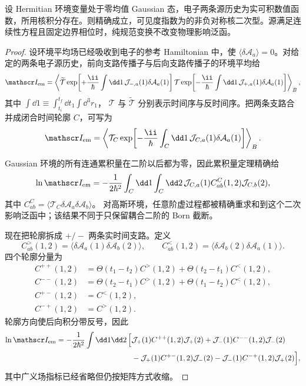 \begin{proposition}
设 Hermitian 环境变量处于零均值 Gaussian 态，电子两条源历史为实可积数值函数，所用核积分存在。则精确成立，可见度指数为的非负对称核二次型。源满足连续性方程且固定边界相位时，纯规范变换不改变物理影响泛函。
\end{proposition}
\begin{proof}
设环境平均场已经吸收到电子的参考 Hamiltonian 中，使
$\langle\delta\mathcal A_a\rangle=0$。对给定的两条电子源历史，前向支路传播子与后向支路传播子的环境平均给
\[
\mathscr I_{\rm em}
=\left\langle
\widetilde{\mathcal T}
\exp\!\left[
+\frac{\ii}{\hbar}\int\dd1\,
\mathcal J_{-,a}(1)\delta\mathcal A_a(1)
\right]
\mathcal T
\exp\!\left[
-\frac{\ii}{\hbar}\int\dd1\,
\mathcal J_{+,a}(1)\delta\mathcal A_a(1)
\right]
\right\rangle_B,
\]
其中
$\int\dd1\equiv\int_{t_i}^{t_f}\dd t_1\int\dd^3r_1$，
$\mathcal T$ 与 $\widetilde{\mathcal T}$ 分别表示时间序与反时间序。把两条支路合并成闭合时间轮廓 $C$，可写为
\[
\mathscr I_{\rm em}
=\left\langle
\mathcal T_C
\exp\!\left[
-\frac{\ii}{\hbar}
\int_C\dd1\,
\mathcal J_{C,a}(1)\delta\mathcal A_a(1)
\right]
\right\rangle_B.
\]

Gaussian 环境的所有连通累积量在二阶以后都为零，因此累积量定理精确给
\begin{equation*}
\ln\mathscr I_{\rm em}
=-\frac1{2\hbar^2}
\int_C\dd1\int_C\dd2\,
\mathcal J_{C,a}(1)
C^{C}_{ab}(1,2)
\mathcal J_{C,b}(2),
\end{equation*}
其中
$C^C_{ab}=\langle\mathcal T_C\delta\mathcal A_a\delta\mathcal A_b\rangle$。
对高斯环境，任意阶虚过程都被精确重求和到这个二次影响泛函中；该结果不同于只保留耦合二阶的 Born 截断。

现在把轮廓拆成 $+/-$ 两条实时间支路。定义
\[
C^>_{ab}(1,2)
=\langle\delta\mathcal A_a(1)\delta\mathcal A_b(2)\rangle,
\qquad
C^<_{ab}(1,2)
=\langle\delta\mathcal A_b(2)\delta\mathcal A_a(1)\rangle.
\]
四个轮廓分量为
\begin{align*}
C^{++}(1,2)
&=\Theta(t_1-t_2)C^>(1,2)
+\Theta(t_2-t_1)C^<(1,2),\\
C^{--}(1,2)
&=\Theta(t_2-t_1)C^>(1,2)
+\Theta(t_1-t_2)C^<(1,2),\\
C^{+-}(1,2)&=C^<(1,2),\\
C^{-+}(1,2)&=C^>(1,2).
\end{align*}
轮廓方向使后向积分带反号，因此
\begin{align*}
\ln\mathscr I_{\rm em}
=-\frac1{2\hbar^2}\int\dd1\dd2\,
\Big[
&\mathcal J_+(1)C^{++}(1,2)\mathcal J_+(2)
+\mathcal J_-(1)C^{--}(1,2)\mathcal J_-(2)\\
&-\mathcal J_+(1)C^{+-}(1,2)\mathcal J_-(2)
-\mathcal J_-(1)C^{-+}(1,2)\mathcal J_+(2)
\Big],
\end{align*}
其中广义场指标已经省略但仍按矩阵方式收缩。


\end{proof}
